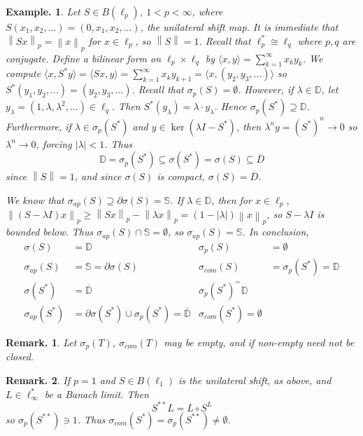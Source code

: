 \documentclass[11pt, a4paper]{memoir}
\newcommand{\norm}[1]{\ensuremath{\left\lVert#1\right\rVert}}
\theoremstyle{change}
\theoremstyle{plain}
\theoremstyle{nonumberplain}
\newtheorem{example}{Example.}
\newtheorem{remark}{Remark.}
\numberwithin{equation}{section}
\begin{document}
\begin{example}
    Let $S\in B(\ell_p)$, $1<p<\infty$, where $S(x_1,x_2,\ldots)=(0,x_1,x_2,\ldots)$, the \textit{unilateral shift} map.
    It is immediate that $\norm{Sx}_p=\norm{x}_p$ for $x\in\ell_p$, so $\norm{S}=1$.
    Recall that $\ell_p^*\cong\ell_q$ where $p,q$ are conjugate.
    Define a bilinear form on $\ell_p\times\ell_q$ by $\langle x,y\rangle=\sum_{k=1}^\infty x_ky_k$.
    We compute $\langle x,S^*y\rangle=\langle Sx,y\rangle=\sum_{k=1}^\infty x_ky_{k+1}=\langle x,(y_2,y_3,\ldots)\rangle$ so $S^*(y_1,y_2,\ldots)=(y_2,y_3,\ldots)$.
    Recall that $\sigma_p(S)=\emptyset$.
    However, if $\lambda\in\mathbb{D}$, let $y_\lambda=(1,\lambda,\lambda^2,\ldots)\in\ell_q$.
    Then $S^*(y_\lambda)=\lambda\cdot y_\lambda$.
    Hence $\sigma_p(S^*)\supseteq\mathbb{D}$.
    Furthermore, if $\lambda\in\sigma_p(S^*)$ and $y\in\ker(\lambda I-S^*)$, then $\lambda^ny=(S^*)^n\to 0$ so $\lambda^n\to 0$, forcing $|\lambda|<1$.
    Thus
    \begin{equation*}
        \mathbb{D}=\sigma_p(S^*)\subseteq\sigma(S^*)=\sigma(S)\subseteq\overline{D}
    \end{equation*}
    since $\norm{S}=1$, and since $\sigma(S)$ is compact, $\sigma(S)=\overline{D}$.

    We know that $\sigma_{ap}(S)\supseteq\partial\sigma(S)=\mathbb{S}$.
    If $\lambda\in\mathbb{D}$, then for $x\in\ell_p$, $\norm{(S-\lambda I)x}_p\geq\norm{Sx}_p-\norm{\lambda x}_p=(1-|\lambda|)\norm{x}_p$, so $S-\lambda I$ is bounded below.
    Thus $\sigma_{ap}(S)\cap\mathbb{S}=\emptyset$, so $\sigma_{ap}(S)=\mathbb{S}$.
    In conclusion,
    \begin{align*}
        \sigma(S)&=\mathbb{D} & \sigma_p(S)&=\emptyset\\
        \sigma_{ap}(S)&=\mathbb{S}=\partial\sigma(S) & \sigma_{com}(S)&=\sigma_p(S^*)=\mathbb{D}\\
        \sigma(S^*) &= \overline{\mathbb{D}} & \sigma_p(S^*)^=\mathbb{D}\\
        \sigma_{ap}(S^*)&=\partial\sigma(S^*)\cup\sigma_p(S^*)=\overline{\mathbb{D}} & \sigma_{com}(S^*)=\emptyset
    \end{align*}
\end{example}
\begin{remark}
    Let $\sigma_p(T)$, $\sigma_{com}(T)$ may be empty, and if non-empty need not be closed.
\end{remark}
\begin{remark}
    If $p=1$ and $S\in B(\ell_1)$ is the unilateral shift, as above, and $L\in\ell_\infty^*$ be a Banach limit.
    Then
    \begin{equation*}
        S^{**}L=L\circ S^L
    \end{equation*}
    so $\sigma_p(S^{**})\ni 1$.
    Thus $\sigma_{com}(S^*)=\sigma_p(S^{**})\neq\emptyset$.
\end{remark}
\end{document}
